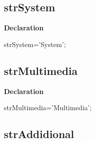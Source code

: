 \documentclass{report}
\newif\ifpdf
\begin{document}
\subsection*{strSystem}
\fi
\label{trstrings-strSystem}
\begin{list}{}{
\setlength{\itemindent}{0cm}
\setlength{\listparindent}{0cm}
\setlength{\leftmargin}{\evensidemargin}
\addtolength{\leftmargin}{\tmplength}
\settowidth{\labelsep}{X}
\addtolength{\leftmargin}{\labelsep}
\setlength{\labelwidth}{\tmplength}
}
\item[\textbf{Declaration}\hfill]
\ifpdf
\begin{flushleft}
\fi
\begin{ttfamily}
strSystem='System';\end{ttfamily}

\ifpdf
\end{flushleft}
\fi

\end{list}
\ifpdf
\subsection*{\large{\textbf{strMultimedia}}\normalsize\hspace{1ex}\hrulefill}
\else
\subsection*{strMultimedia}
\fi
\label{trstrings-strMultimedia}
\begin{list}{}{
\setlength{\itemindent}{0cm}
\setlength{\listparindent}{0cm}
\setlength{\leftmargin}{\evensidemargin}
\addtolength{\leftmargin}{\tmplength}
\settowidth{\labelsep}{X}
\addtolength{\leftmargin}{\labelsep}
\setlength{\labelwidth}{\tmplength}
}
\item[\textbf{Declaration}\hfill]
\ifpdf
\begin{flushleft}
\fi
\begin{ttfamily}
strMultimedia='Multimedia';\end{ttfamily}

\ifpdf
\end{flushleft}
\fi

\end{list}
\ifpdf
\subsection*{\large{\textbf{strAddidional}}\normalsize\hspace{1ex}\hrulefill}
\else
\end{document}
